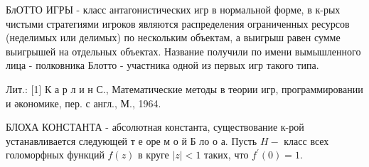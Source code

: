 \documentclass[10pt]{article}
\begin{document}
БлОТТО ИГРЫ - класс антагонистических игр в нормальной форме, в к-рых чистыми стратегиями игроков являются распределения ограниченных ресурсов (неделимых или делимых) по нескольким объектам, а выигрыш равен сумме выигрышей на отдельных объектах. Название получили по имени вымышленного лица - полковника Блотто - участника одной из первых игр такого типа.



Лит.: [1] К а р л и н С., Математические методы в теории игр, программировании и әкономике, пер. с англ., М., 1964.



БЛОХА КОНСТАНТА - абсолютная константа, существование к-рой устанавливается следующей т е оре м о й Б ло о а. Пусть $H-$ класс всех голоморфных функций $f(z)$ в круге $|z|<1$ таких, что $f^{\prime}(0)=1$.
\end{document}
